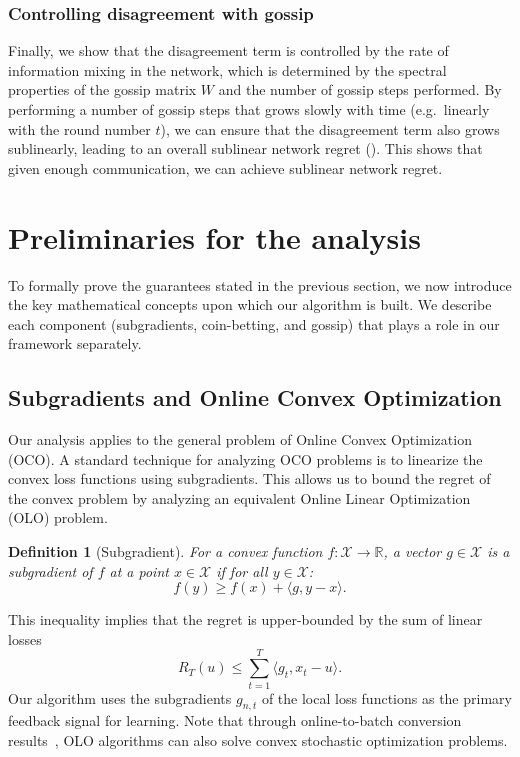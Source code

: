 \documentclass[journal]{IEEEtran} %
\newtheorem{definition}{Definition}
\begin{document}
\subsubsection{Controlling disagreement with gossip}
Finally, we show that the disagreement term is controlled by the rate of information mixing in the network, which is determined by the spectral properties of the gossip matrix $W$ and the number of gossip steps performed.
By performing a number of gossip steps that grows slowly with time (e.g.~linearly with the round number $t$), we can ensure that the disagreement term also grows sublinearly, leading to an overall sublinear network regret ().
This shows that given enough communication, we can achieve sublinear network regret.

\section{Preliminaries for the analysis}\label{sec:preliminaries}
To formally prove the guarantees stated in the previous section, we now introduce the key mathematical concepts upon which our algorithm is built.
We describe each component (subgradients, coin-betting, and gossip) that plays a role in our framework separately.

\subsection{Subgradients and Online Convex Optimization}
Our analysis applies to the general problem of Online Convex Optimization (OCO).
A standard technique for analyzing OCO problems is to linearize the convex loss functions using subgradients.
This allows us to bound the regret of the convex problem by analyzing an equivalent Online Linear Optimization (OLO) problem.

\begin{definition}[Subgradient]
    For a convex function $f: \mathcal{X}\rightarrow \mathbb{R}$, a vector $g \in \mathcal{X}$ is a \emph{subgradient} of $f$ at a point $x \in \mathcal{X}$ if for all $y \in \mathcal{X}$:
    \begin{equation*}
        f(y) \geq f(x) + \langle g, y - x \rangle.
    \end{equation*}
\end{definition}
This inequality implies that the regret is upper-bounded by the sum of linear losses
\begin{equation}
    R_{T}(u) \leq \sum_{t=1}^{T} \langle g_{t}, x_{t} - u \rangle.
\end{equation}
Our algorithm uses the subgradients $g_{n,t}$ of the local loss functions as the primary feedback signal for learning.
Note that through online-to-batch conversion results~\cite{cesa-bianchi_generalization_2004}, OLO algorithms can also solve convex stochastic optimization problems.
\end{document}
